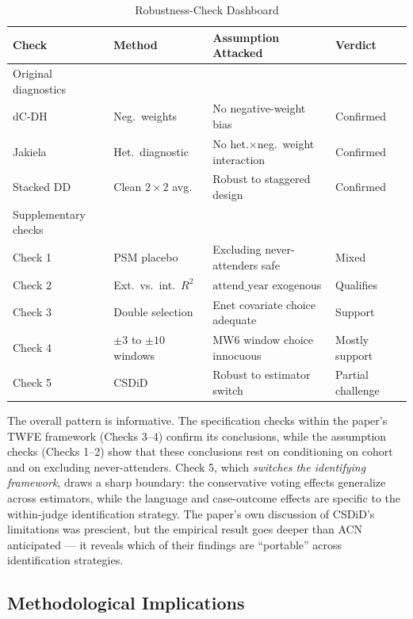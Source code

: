 \documentclass[12pt,a4paper]{article}
\begin{document}
\begin{table}[htbp]
\centering
\caption{Robustness-Check Dashboard}
\label{tab:dashboard}
\begin{threeparttable}
\begin{tabular}{p{1.8cm}p{2.5cm}p{3.5cm}p{2cm}}
\toprule
Check & Method & Assumption Attacked & Verdict \\
\midrule
Original diagnostics & & & \\
\quad dC-DH & Neg.\ weights & No negative-weight bias & Confirmed \\
\quad Jakiela & Het.\ diagnostic & No het.$\times$neg.\ weight interaction & Confirmed \\
\quad Stacked DD & Clean $2\times2$ avg. & Robust to staggered design & Confirmed \\
\midrule
Supplementary checks & & & \\
Check 1 & PSM placebo & Excluding never-attenders safe & Mixed \\
Check 2 & Ext.\ vs.\ int.\ $R^2$ & $\text{attend\_year}$ exogenous & Qualifies \\
Check 3 & Double selection & Enet covariate choice adequate & Support \\
Check 4 & $\pm 3$ to $\pm 10$ windows & MW6 window choice innocuous & Mostly support \\
Check 5 & CSDiD & Robust to estimator switch & Partial challenge \\
\bottomrule
\end{tabular}
\end{threeparttable}
\end{table}

The overall pattern is informative. The specification checks within the paper's TWFE framework (Checks 3--4) confirm its conclusions, while the assumption checks (Checks 1--2) show that these conclusions rest on conditioning on cohort and on excluding never-attenders. Check 5, which \emph{switches the identifying framework}, draws a sharp boundary: the conservative voting effects generalize across estimators, while the language and case-outcome effects are specific to the within-judge identification strategy. The paper's own discussion of CSDiD's limitations was prescient, but the empirical result goes deeper than ACN anticipated --- it reveals which of their findings are ``portable'' across identification strategies.

\subsection{Methodological Implications}
\end{document}
